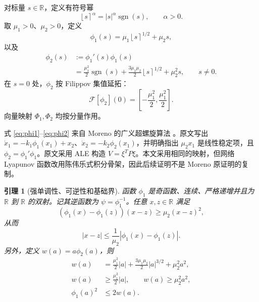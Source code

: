 \documentclass[UTF8,a4paper,12pt]{ctexart}
\newtheorem{lemma}{引理}
\newcommand{\R}{\mathbb{R}}
\newcommand{\sgn}{\operatorname{sgn}}
\newcommand{\abs}[1]{\left\lvert #1\right\rvert}
\newcommand{\ipow}[2]{\left\lfloor #1\right\rceil^{#2}}
\begin{document}
对标量 $s\in\R$，定义有符号幂
\begin{equation}
  \ipow{s}{\alpha}=\abs{s}^{\alpha}\sgn(s),\qquad \alpha>0.
\end{equation}
取 $\mu_1>0$、$\mu_2>0$，定义
\begin{equation}
 \phi_1(s)=\mu_1\ipow{s}{1/2}+\mu_2s,
\label{eq:phi1}
\end{equation}
以及
\begin{equation}
\begin{aligned}
 \phi_2(s)
 &:=\phi_1'(s)\phi_1(s)\\
 &=\frac{\mu_1^2}{2}\sgn(s)
 +\frac{3\mu_1\mu_2}{2}\ipow{s}{1/2}
 +\mu_2^2s,
 \qquad s\ne0.
\end{aligned}
\label{eq:phi2}
\end{equation}
在 $s=0$ 处，$\phi_2$ 按 Filippov 集值延拓：
\begin{equation}
 \mathcal F[\phi_2](0)
 =\left[-\frac{\mu_1^2}{2},\frac{\mu_1^2}{2}\right].
\end{equation}
向量映射 $\Phi_1,\Phi_2$ 均按分量作用。

\begin{morenobox}
式 \eqref{eq:phi1}--\eqref{eq:phi2} 来自 Moreno 的广义超螺旋算法 \cite{Moreno2009}。原文写出
$\dot x_1=-k_1\phi_1(x_1)+x_2$、$\dot x_2=-k_2\phi_2(x_1)$，并明确指出 $\mu_2x_1$ 是线性稳定项，且 $\phi_2=\phi_1'\phi_1$。原文采用 ALE 构造 $V=\xi^TP\xi$。本文采用相同的映射，但网络 Lyapunov 函数改用陈伟乐式积分骨架，因此后续证明不是 Moreno 原证明的复制。
\end{morenobox}

\begin{lemma}[强单调性、可逆性和基础界]
函数 $\phi_1$ 是奇函数、连续、严格递增并且为 $\R$ 到 $\R$ 的双射。记其逆函数为 $\psi=\phi_1^{-1}$。任意 $x,z\in\R$ 满足
\begin{equation}
 (\phi_1(x)-\phi_1(z))(x-z)\ge\mu_2(x-z)^2,
\label{eq:strong-monotone}
\end{equation}
从而
\begin{equation}
 \abs{x-z}\le\frac{1}{\mu_2}
 \abs{\phi_1(x)-\phi_1(z)}.
\label{eq:inverse-lipschitz}
\end{equation}
另外，定义 $w(a)=a\phi_2(a)$，则
\begin{equation}
\begin{aligned}
 w(a)
 &=\frac{\mu_1^2}{2}\abs a
 +\frac{3\mu_1\mu_2}{2}\abs a^{3/2}
 +\mu_2^2a^2,\\
 w(a)&\ge\frac{\mu_1^2}{2}\abs a,\qquad
 w(a)\ge\mu_2^2a^2,\\
 \phi_1(a)^2&\le2w(a).
\end{aligned}
\label{eq:w-bounds}
\end{equation}
\end{lemma}
\end{document}
